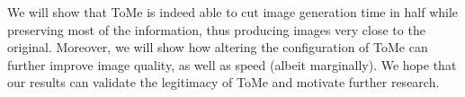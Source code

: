 We will show that ToMe is indeed able to cut image generation time in half while preserving most of the information, thus producing images very close to the original. Moreover, we will show how altering the configuration of ToMe can further improve image quality, as well as speed (albeit marginally). We hope that our results can validate the legitimacy of ToMe and motivate further research.\\


